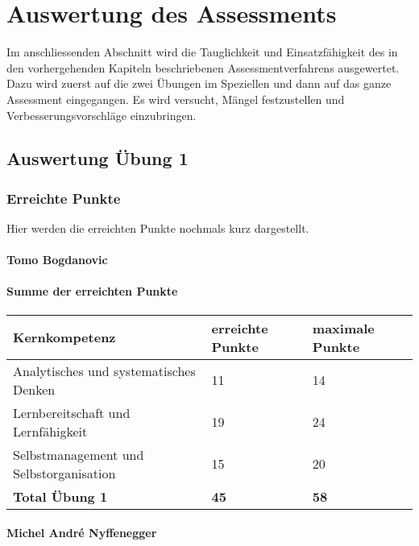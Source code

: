 \chapter{Auswertung des Assessments}

Im anschliessenden Abschnitt wird die Tauglichkeit und Einsatzfähigkeit des in den vorhergehenden Kapiteln beschriebenen Assessmentverfahrens ausgewertet. Dazu wird zuerst auf die zwei Übungen im Speziellen und dann auf das ganze Assessment eingegangen. Es wird versucht, Mängel festzustellen und Verbesserungsvorschläge einzubringen.

\section{Auswertung Übung 1}

\subsection{Erreichte Punkte}
Hier werden die erreichten Punkte nochmals kurz dargestellt.
\subsubsection{Tomo Bogdanovic}

\subsubsection{Summe der erreichten Punkte}
\begin{center}
  \begin{tabular}{ | p{7cm} | p{3cm} | p{3cm} |}
   \hline
   \textbf{Kernkompetenz} & \textbf{erreichte Punkte} & \textbf{maximale Punkte} \\ \hline
   Analytisches und systematisches Denken & 11 & 14\\ \hline
  Lernbereitschaft und Lernfähigkeit & 19 & 24\\ \hline
   Selbstmanagement und Selbstorganisation & 15 & 20\\ \hline
   \textbf{Total Übung 1} & \textbf{45} & \textbf{58}\\ \hline
  \end{tabular}
\end{center}

\subsubsection{Michel André Nyffenegger}

